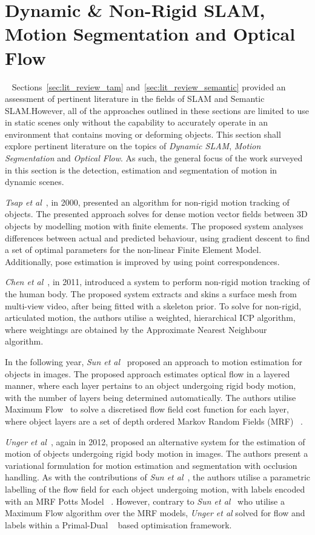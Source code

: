\section{Dynamic & Non-Rigid SLAM, Motion Segmentation and Optical Flow}
~\label{sec:lit_review_dynamic}
Sections~\ref{sec:lit_review_tam} and~\ref{sec:lit_review_semantic} provided an assessment 
of pertinent literature in the fields of SLAM and Semantic SLAM.\@ However, all of the 
approaches outlined in these sections are limited to use in static scenes only without 
the capability to accurately operate in an environment that contains moving or deforming objects. 
This section shall explore pertinent literature on the topics of \textit{Dynamic SLAM}, 
\textit{Motion Segmentation} and \textit{Optical Flow}. As such, the general focus of the 
work surveyed in this section is the detection, estimation and segmentation of motion in 
dynamic scenes.

\textit{Tsap et al}~\cite{Tsap2000}, in 2000, presented an algorithm for non-rigid motion 
tracking of objects. The presented approach solves for dense motion vector fields between 
3D objects by modelling motion with finite elements. The proposed system analyses differences 
between actual and predicted behaviour, using gradient descent to find a set of optimal parameters 
for the non-linear Finite Element Model. Additionally, pose estimation is improved by using point 
correspondences.

\textit{Chen et al}~\cite{Chen2011}, in 2011, introduced a system to perform non-rigid motion 
tracking of the human body. The proposed system extracts and skins a surface mesh from 
multi-view video, after being fitted with a skeleton prior. To solve for non-rigid, articulated 
motion, the authors utilise a weighted, hierarchical ICP algorithm, where weightings are obtained 
by the Approximate Nearest Neighbour~\cite{Indyk2000} algorithm.

In the following year, \textit{Sun et al}~\cite{Sun2012} proposed an approach to motion estimation 
for objects in images. The proposed approach estimates optical flow in a layered manner, where each 
layer pertains to an object undergoing rigid body motion, with the number of layers being determined 
automatically. The authors utilise Maximum Flow~\cite{Lamich2017} to solve a discretised flow field cost 
function for each layer, where object layers are a set of depth ordered Markov Random Fields (MRF) 
~\cite{BishopPRML, Murphy2012ML}.

\textit{Unger et al}~\cite{Unger2012}, again in 2012, proposed an alternative system for the 
estimation of motion of objects undergoing rigid body motion in images. The authors present a 
variational formulation for motion estimation and segmentation with occlusion handling. As with 
the contributions of \textit{Sun et al}~\cite{Sun2012}, the authors utilise a parametric labelling 
of the flow field for each object undergoing motion, with labels encoded with an MRF Potts Model
~\cite{Levada2008}. However, contrary to \textit{Sun et al}~\cite{Sun2012} who utilise a Maximum Flow 
algorithm over the MRF models, \textit{Unger et al} solved for flow and labels within a Primal-Dual
~\cite{Boyd2004Convex} based optimisation framework.

